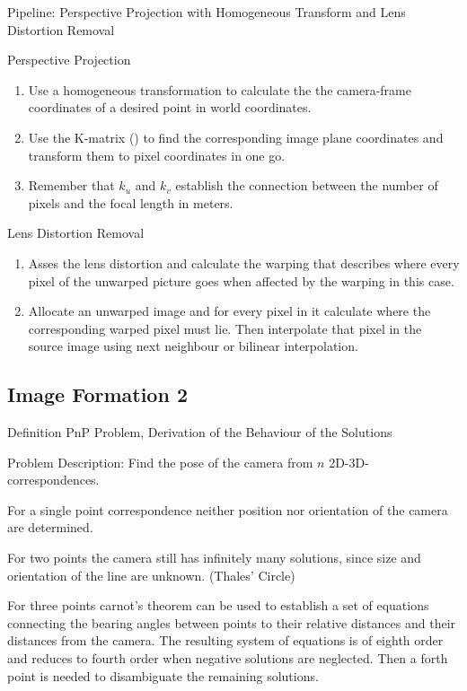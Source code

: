 \documentclass[10pt,a4paper]{scrartcl}
\begin{document}
\begin{multicols*}{2}
\begin{QandA}{Pipeline: Perspective Projection with Homogeneous Transform and Lens Distortion Removal}
\item Perspective Projection
\begin{enumerate}
\item Use a homogeneous transformation to calculate the the camera-frame coordinates of a desired point in world coordinates.
\item Use the K-matrix () to find the corresponding image plane coordinates and transform them to pixel coordinates in one go.
\item Remember that $k_u$ and $k_v$ establish the connection between the number of pixels and the focal length in meters.
\end{enumerate}
\item Lens Distortion Removal
\begin{enumerate}
\item Asses the lens distortion and calculate the warping that describes where every pixel of the unwarped picture goes when affected by the warping in this case.
\item Allocate an unwarped image and for every pixel in it calculate where the corresponding warped pixel must lie. Then interpolate that pixel in the source image using next neighbour or bilinear interpolation.
\end{enumerate}
\end{QandA}

\subsection*{Image Formation 2}

\begin{QandA}{Definition PnP Problem, Derivation of the Behaviour of the Solutions}
\item Problem Description: Find the pose of the camera from $n$ 2D-3D-correspondences.
\item For a single point correspondence neither position nor orientation of the camera are determined.
\item For two points the camera still has infinitely many solutions, since size and orientation of the line are unknown. (Thales' Circle)
\item For three points carnot's theorem can be used to establish a set of equations connecting the bearing angles between points to their relative distances and their distances from the camera. The resulting system of equations is of eighth order and reduces to fourth order when negative solutions are neglected. Then a forth point is needed to disambiguate the remaining solutions. 
\end{QandA}


\end{multicols*}
\end{document}
